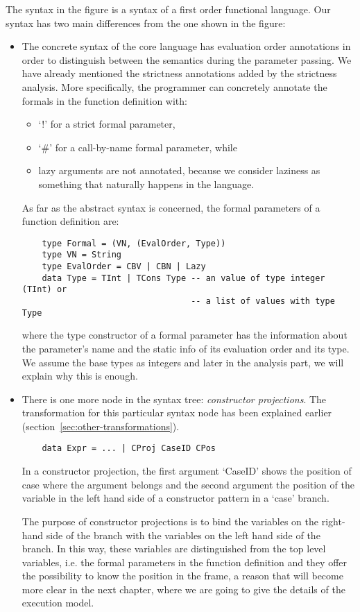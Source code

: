 \documentclass[diploma]{softlab-thesis}
\begin{document}
The syntax in the figure is a syntax of a first order functional language. Our syntax has two main 
differences from the one shown in the figure:
\begin{itemize}
  \item The concrete syntax of the core language has evaluation order annotations in order to 
  distinguish between the semantics during the parameter passing. We have already mentioned the 
  strictness annotations added by the strictness analysis. 
  More specifically, the programmer can concretely annotate the formals in the function definition with:
    \begin{itemize}
      \item {`!' for a strict formal parameter,}
      \item { `\#' for a call-by-name formal parameter, while}
      \item {lazy arguments are not annotated, because we consider laziness as something that naturally happens 
      in the language.}
    \end{itemize}
  
  As far as the abstract syntax is concerned, the formal parameters of a function definition are:
  \begin{verbatim}
    type Formal = (VN, (EvalOrder, Type))
    type VN = String 
    type EvalOrder = CBV | CBN | Lazy 
    data Type = TInt | TCons Type -- an value of type integer (TInt) or 
                                  -- a list of values with type Type
  \end{verbatim}
  where the type constructor of a formal parameter has the information about the parameter's name and 
  the static info of its evaluation order and its type. We assume the base types as integers and later in 
  the analysis part, we will explain why this is enough.

  \item There is one more node in the syntax tree: \textit{constructor projections}. The transformation for this 
  particular syntax node has been explained earlier (section~\ref{sec:other-transformations}). 
  \begin{verbatim}
    data Expr = ... | CProj CaseID CPos 
  \end{verbatim}
  In a constructor projection, the first argument `CaseID' shows the position of case where the argument belongs
  and the second argument the position of the variable in the left hand side of a constructor pattern in a `case' branch.
  
  The purpose of constructor projections is to bind the variables on the right-hand side of the branch with the variables 
  on the left hand side of the branch. In this way, these variables are distinguished from the top level variables, i.e.
  the formal parameters in the function definition and they offer the possibility to know the position in the frame, 
  a reason that will become more clear in the next chapter, where we are going to give the details of the 
  execution model.
\end{itemize}
\end{document}
